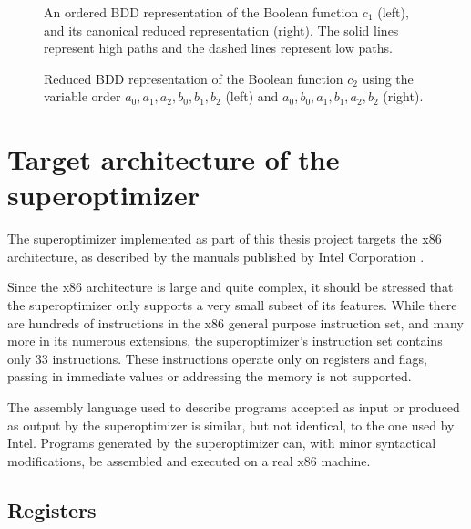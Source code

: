 \documentclass[a4paper,11pt]{kth-mag}
\begin{document}
\begin{figure}[p]
\centering

\caption{An ordered BDD representation of the Boolean function $c_1$ (left), and its canonical reduced representation (right). The solid lines represent high paths and the dashed lines represent low paths.}
\label{fig:bdd_c1}
\end{figure}

\begin{figure}[p]
\centering

\caption{Reduced BDD representation of the Boolean function $c_2$ using the variable order $a_0,a_1,a_2,b_0,b_1,b_2$ (left) and $a_0,b_0,a_1,b_1,a_2,b_2$ (right).}
\label{fig:bdd_c2_bad}
\end{figure}

\chapter{Target architecture of the superoptimizer}
\label{ch:target_architecture}

The superoptimizer implemented as part of this thesis project targets the x86 architecture, as described by the manuals published by Intel Corporation \cite{intel_1,intel_2a,intel_2b}.

Since the x86 architecture is large and quite complex, it should be stressed that the superoptimizer only supports a very small subset of its features.
While there are hundreds of instructions in the x86 general purpose instruction set, and many more in its numerous extensions, the superoptimizer's instruction set contains only 33 instructions.
These instructions operate only on registers and flags, passing in immediate values or addressing the memory is not supported.


The assembly language used to describe programs accepted as input or produced as output by the superoptimizer is similar, but not identical, to the one used by Intel.
Programs generated by the superoptimizer can, with minor syntactical modifications, be assembled and executed on a real x86 machine.


\section{Registers}
\end{document}
